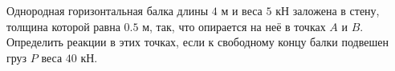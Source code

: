 Однородная горизонтальная балка длины $4$ м и веса $5$ кН заложена в
стену, толщина которой равна $0.5$ м, так, что опирается на неё в точках
$A$ и $B$. Определить реакции в этих точках, если к свободному концу
балки подвешен груз $P$  веса $40$ кН.
